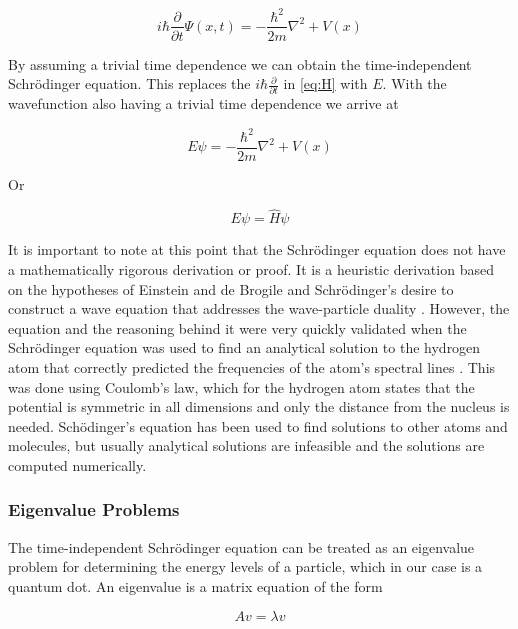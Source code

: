 \documentclass[authoryearcitations]{UoYCSproject}
\begin{document}
\begin{equation}
i\hbar\frac{\partial}{\partial t}\Psi (x,t) = -\frac{\hbar ^2}{2m}\nabla ^2 + V(x)
\label{eq:H}
\end{equation}

By assuming a trivial time dependence we can obtain the time-independent Schr\"{o}dinger equation. This replaces
the $i\hbar \frac{\partial}{\partial t}$ in \ref{eq:H} with $E$. With the wavefunction also having a trivial time
dependence we arrive at

\begin{equation}
E\psi = -\frac{\hbar ^2}{2m}\nabla ^2 + V(x) 
\label{eq:timeIndependent}
\end{equation}


Or

\begin{equation}
E\psi = \hat{H}\psi  
\label{eq:eigenSchrodinger}
\end{equation}

It is important to note at this point that the Schr\"{o}dinger equation does not have a mathematically rigorous 
derivation or proof. It is a heuristic derivation based on the hypotheses of Einstein and de Brogile and Schr\"{o}dinger's
desire to construct a wave equation that addresses the wave-particle duality \cite{ricardo, qp}. %
However, the equation and the reasoning behind it were very quickly validated when the Schr\"{o}dinger equation was used
to find an analytical solution to the hydrogen atom that correctly predicted the frequencies of the atom's spectral lines
\cite{qp}. This was done using Coulomb's law, which for the hydrogen atom states that the potential is symmetric in all dimensions
and only the distance from the nucleus is needed. Sch\"{o}dinger's equation has been used to find solutions to other atoms and
molecules, but usually analytical solutions are infeasible and the solutions are computed numerically. 


\subsubsection{Eigenvalue Problems}
The time-independent Schr\"{o}dinger equation can be treated as an eigenvalue problem for determining the energy levels
of a particle, which in our case is a quantum dot. An eigenvalue is a matrix equation of the form

\begin{equation}
Av = \lambda v
\label{eq:eigenDef}
\end{equation}
\end{document}
